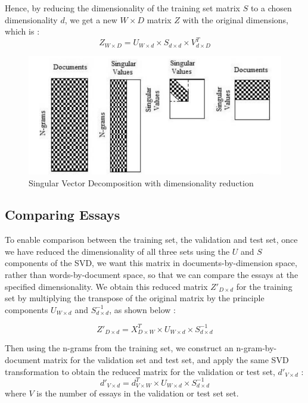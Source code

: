 \documentclass[10pt,letterpaper]{article}
\begin{document}
Hence, by reducing the dimensionality of the training set matrix $S$ to a chosen dimensionality $d$, we get a new $W \times D$ matrix $Z$ with the original dimensions, which is \cite{islam2010automated}:
$$Z_{W\times D} = U_{W\times d} \times S_{d \times d} \times V^{T}_{d \times D}$$

\begin{figure}[ht]
\begin{center}
\includegraphics[scale=0.65]{img/SVDReduced.png}
\end{center}
\caption{Singular Vector Decomposition with dimensionality reduction \cite{islam2010automated}} 
\end{figure}

\subsection{Comparing Essays}

To enable comparison between the training set, the validation and test set, once we have reduced the dimensionality of all three sets using the $U$ and $S$ components of the SVD, we want this matrix in documents-by-dimension space, rather than words-by-document space, so that we can compare the essays at the specified dimensionality. We obtain this reduced matrix $Z'_{D\times d}$ for the training set by multiplying the transpose of the original matrix by the principle components $U_{W\times d}$ and $ S^{-1}_{d \times d}$, as shown below \cite{islam2010automated}:

$$Z'_{D\times d} = X^T_{D\times W} \times U_{W\times d} \times S^{-1}_{d \times d}$$

Then using the n-grams from the training set, we construct an n-gram-by-document matrix for the validation set and test set, and apply the same SVD transformation to obtain the reduced matrix for the validation or test set, $d'_{V \times d}$ \cite{islam2010automated}:
$$d'_{V \times d} = d^T_{V \times W} \times U_{W\times d} \times S^{-1}_{d \times d}$$
where $V$ is the number of essays in the validation or test set set. 
\end{document}
